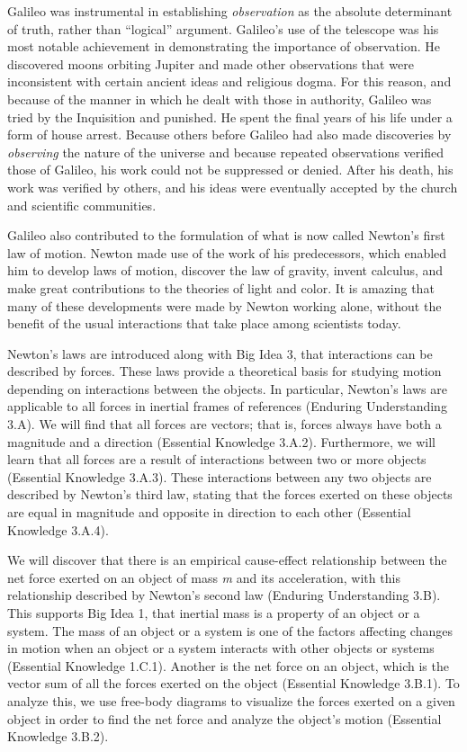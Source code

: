 \documentclass[
]{book}
\begin{document}
Galileo was instrumental in establishing \emph{observation} as the absolute
determinant of truth, rather than ``logical'' argument. Galileo's use of
the telescope was his most notable achievement in demonstrating the
importance of observation. He discovered moons orbiting Jupiter and made
other observations that were inconsistent with certain ancient ideas and
religious dogma. For this reason, and because of the manner in which he
dealt with those in authority, Galileo was tried by the Inquisition and
punished. He spent the final years of his life under a form of house
arrest. Because others before Galileo had also made discoveries by
\emph{observing} the nature of the universe and because repeated observations
verified those of Galileo, his work could not be suppressed or denied.
After his death, his work was verified by others, and his ideas were
eventually accepted by the church and scientific communities.

Galileo also contributed to the formulation of what is now called
Newton's first law of motion. Newton made use of the work of his
predecessors, which enabled him to develop laws of motion, discover the
law of gravity, invent calculus, and make great contributions to the
theories of light and color. It is amazing that many of these
developments were made by Newton working alone, without the benefit of
the usual interactions that take place among scientists today.

Newton's laws are introduced along with Big Idea 3, that interactions
can be described by forces. These laws provide a theoretical basis for
studying motion depending on interactions between the objects. In
particular, Newton's laws are applicable to all forces in inertial
frames of references (Enduring Understanding 3.A). We will find that all
forces are vectors; that is, forces always have both a magnitude and a
direction (Essential Knowledge 3.A.2). Furthermore, we will learn that
all forces are a result of interactions between two or more objects
(Essential Knowledge 3.A.3). These interactions between any two objects
are described by Newton's third law, stating that the forces exerted on
these objects are equal in magnitude and opposite in direction to each
other (Essential Knowledge 3.A.4).

We will discover that there is an empirical cause-effect relationship
between the net force exerted on an object of mass \emph{m} and its
acceleration, with this relationship described by Newton's second law
(Enduring Understanding 3.B). This supports Big Idea 1, that inertial
mass is a property of an object or a system. The mass of an object or a
system is one of the factors affecting changes in motion when an object
or a system interacts with other objects or systems (Essential Knowledge
1.C.1). Another is the net force on an object, which is the vector sum
of all the forces exerted on the object (Essential Knowledge 3.B.1). To
analyze this, we use free-body diagrams to visualize the forces exerted
on a given object in order to find the net force and analyze the
object's motion (Essential Knowledge 3.B.2).
\end{document}
